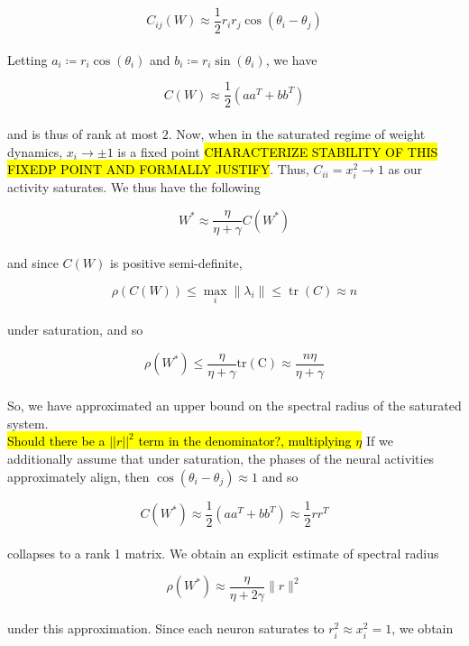 \documentclass[paper=a4, fontsize=11pt]{scrartcl} %
\numberwithin{equation}{section} %
\numberwithin{figure}{section} %
\numberwithin{table}{section} %
\begin{document}
\begin{equation}
    C_{ij}(W) \approx \frac{1}{2}r_ir_j\cos(\theta_i - \theta_j)
\end{equation}
\\
Letting $a_i \coloneq r_i\cos(\theta_i)$ and $b_i \coloneq r_i \sin (\theta_i)$, we have

\begin{equation}
    C(W) \approx \frac{1}{2}(aa^T + bb^T)
\end{equation}
\\
and is thus of rank at most $2$. Now, when in the saturated regime of weight dynamics, $x_i \to \pm 1$ is a fixed point \hl{CHARACTERIZE STABILITY OF THIS FIXEDP POINT AND FORMALLY JUSTIFY}. Thus, $C_{ii} = x_i^2 \to 1$ as our activity saturates. We thus have the following

\begin{equation}
    W^{*} \approx \frac{\eta}{\eta + \gamma}C(W^*)
\end{equation}
\\
and since $C(W)$ is positive semi-definite,

\begin{equation}
    \rho(C(W)) \le \max_i{\|\lambda_i\|} \le \operatorname{tr}(C) \approx n
\end{equation}
\\
under saturation, and so 

\begin{equation}
    \rho(W^*) \le \frac{\eta}{\eta + \gamma}\operatorname{tr(C)} \approx \frac{n \eta}{\eta + \gamma}
\end{equation}
\\
So, we have approximated an upper bound on the spectral radius of the saturated system.
\vspace{0.5cm}
\\
\hl{Should there be a $||r||^2$ term in the denominator?, multiplying $\eta$} If we additionally assume that under saturation, the phases of the neural activities approximately align, then $\cos(\theta_i - \theta_j) \approx 1$ and so

\begin{equation}
    C(W^*) \approx \frac{1}{2}(aa^T + bb^T) \approx \frac{1}{2}rr^T
\end{equation}
\\
collapses to a rank 1 matrix. We obtain an explicit estimate of spectral radius

\begin{equation}
    \rho(W^*) \approx \frac{\eta}{\eta + 2\gamma}\|r\|^2
\end{equation}
\\
under this approximation. Since each neuron saturates to $r_i^2 \approx x_i^2 = 1$, we obtain
\end{document}
